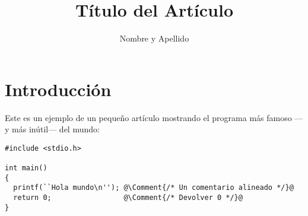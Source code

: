 \documentclass[12pt,a4paper]{article}
\newcommand{\titleinfo}{Título del Artículo}
\newcommand{\authorinfo}{Nombre y Apellido}
\newcommand*{\Comment}[1]{\hfill\makebox[6cm][l]{#1}}%
\begin{document}
\title{\titleinfo}
\author{\authorinfo}
\date{}

\maketitle
\thispagestyle{firststyle} %

\section{Introducción}

Este es un ejemplo de un pequeño artículo mostrando el programa más
famoso ---y más inútil--- del mundo:

\begin{lstlisting}
#include <stdio.h>

int main()
{
  printf(``Hola mundo\n''); @\Comment{/* Un comentario alineado */}@
  return 0;                 @\Comment{/* Devolver 0 */}@
}
\end{lstlisting}
\end{document}
